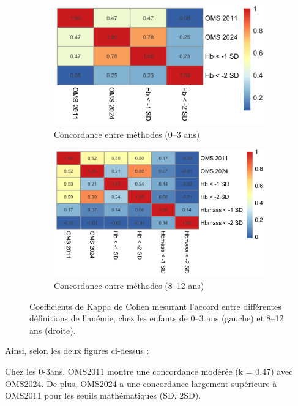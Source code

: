 \documentclass[12pt,a4paper]{article}
\begin{document}
\begin{figure}[H]
    \centering

    \begin{subfigure}{0.48\textwidth}
        \includegraphics[width=\linewidth]{kappa3.png}
        \caption{Concordance entre méthodes (0–3 ans)}
        \label{fig:kappa_0_3}
    \end{subfigure}
    \hfill
    \begin{subfigure}{0.48\textwidth}
        \includegraphics[width=\linewidth]{kappa12.png}
        \caption{Concordance entre méthodes (8–12 ans)}
        \label{fig:kappa_8_12}
    \end{subfigure}

    \caption{Coefficients de Kappa de Cohen mesurant l’accord entre différentes définitions de l’anémie, chez les enfants de 0–3 ans (gauche) et 8–12 ans (droite).}
    \label{fig:kappa_matrices}
\end{figure}

Ainsi, selon les deux figures ci-dessus :

Chez les 0-3ans, OMS2011 montre une concordance modérée (k = 0.47) avec OMS2024. De plus, OMS2024 a une concordance largement supérieure à OMS2011 pour les seuils mathématiques (SD, 2SD).
\end{document}
